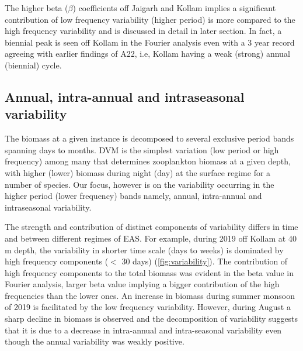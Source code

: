 \documentclass{article}
\begin{document}
	The higher beta ($\beta$) coefficients off Jaigarh and Kollam implies a significant contribution of low frequency variability (higher period) is more compared to the high frequency variability and is discussed in detail in later section. In fact, a biennial peak is seen off Kollam in the Fourier analysis even with a 3 year record agreeing with earlier findings of A22, i.e, Kollam having a weak (strong) annual (biennial) cycle. 
	
	\subsection{Annual, intra-annual and intraseasonal variability}
	\label{vari}
	The biomass at a given instance is decomposed to several exclusive period bands spanning days to months. DVM is the simplest variation (low period or high frequency) among many that determines zooplankton biomass at a given depth, with higher (lower) biomass during night (day) at the surface regime for a number of species. Our focus, however is on the variability occurring in the higher period (lower frequency) bands namely, annual, intra-annual and intraseasonal variability. 
	
	The strength and contribution of distinct components of variability differs in time and between different regimes of EAS. For example, during 2019 off Kollam at 40 m depth, the variability in shorter time scale (days to weeks) is dominated by high frequency components ($<$ 30 days) (\cref{fig:variability}). The contribution of high frequency components to the total biomass was evident in the beta value in Fourier analysis, larger beta value implying a bigger contribution of the high frequencies	than the lower ones. An increase in biomass during summer monsoon of 2019 is facilitated by the low frequency variability. However, during August a sharp decline in biomass is observed and the decomposition of variability suggests that it is due to a decrease in intra-annual and intra-seasonal variability even though the annual variability was weakly positive. 
		
\end{document}

